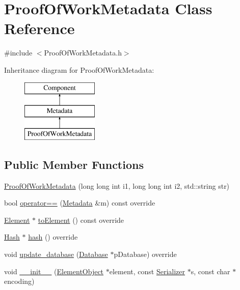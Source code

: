 \hypertarget{classProofOfWorkMetadata}{}\section{Proof\+Of\+Work\+Metadata Class Reference}
\label{classProofOfWorkMetadata}


{\ttfamily \#include $<$Proof\+Of\+Work\+Metadata.\+h$>$}

Inheritance diagram for Proof\+Of\+Work\+Metadata\+:\begin{figure}[H]
\begin{center}
\leavevmode
\includegraphics[height=3.000000cm]{classProofOfWorkMetadata}
\end{center}
\end{figure}
\subsection*{Public Member Functions}
\begin{DoxyCompactItemize}
\item 
\mbox{\hyperlink{classProofOfWorkMetadata_a8fe975e4a12a0782becb25d1d5683a21}{Proof\+Of\+Work\+Metadata}} (long long int i1, long long int i2, std\+::string str)
\item 
bool \mbox{\hyperlink{classProofOfWorkMetadata_ae490506a28967c7180163fc156dd5d51}{operator==}} (\mbox{\hyperlink{classMetadata}{Metadata}} \&m) const override
\item 
\mbox{\hyperlink{classElement}{Element}} $\ast$ \mbox{\hyperlink{classProofOfWorkMetadata_a2aab4c26afb3a85a712cc065028274d9}{to\+Element}} () const override
\item 
\mbox{\hyperlink{classHash}{Hash}} $\ast$ \mbox{\hyperlink{classProofOfWorkMetadata_af29f8f40d4b438eaa9434b51c1aff7c6}{hash}} () override
\item 
void \mbox{\hyperlink{classProofOfWorkMetadata_add9667954ffeaee75f3329c6c832e8b7}{update\+\_\+database}} (\mbox{\hyperlink{classDatabase}{Database}} $\ast$p\+Database) override
\item 
void \mbox{\hyperlink{classComponent_a28212595f8ee85fe009bd233bc99b2fc}{\+\_\+\+\_\+init\+\_\+\+\_\+}} (\mbox{\hyperlink{classElementObject}{Element\+Object}} $\ast$element, const \mbox{\hyperlink{classSerializer}{Serializer}} $\ast$s, const char $\ast$encoding)
\end{DoxyCompactItemize}
